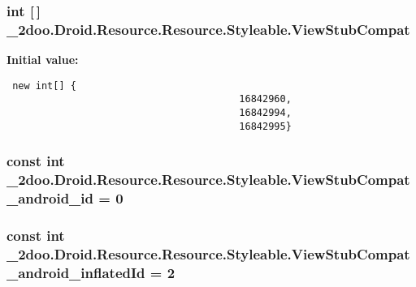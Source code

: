 \hypertarget{class__2doo_1_1_droid_1_1_resource_1_1_styleable_10c5bdeb8496455d9d7673eae67efe7a}{
\subsubsection[{ViewStubCompat}]{\setlength{\rightskip}{0pt plus 5cm}int \mbox{[}$\,$\mbox{]} \_\-2doo.Droid.Resource.Resource.Styleable.ViewStubCompat}}
\label{class__2doo_1_1_droid_1_1_resource_1_1_styleable_10c5bdeb8496455d9d7673eae67efe7a}


\textbf{Initial value:}

\begin{Code}\begin{verbatim} new int[] {
                                        16842960,
                                        16842994,
                                        16842995}
\end{verbatim}
\end{Code}
\hypertarget{class__2doo_1_1_droid_1_1_resource_1_1_styleable_65aff0a08cd100f823e9e9bd06397e64}{
\subsubsection[{ViewStubCompat\_\-android\_\-id}]{\setlength{\rightskip}{0pt plus 5cm}const int \_\-2doo.Droid.Resource.Resource.Styleable.ViewStubCompat\_\-android\_\-id = 0}}
\label{class__2doo_1_1_droid_1_1_resource_1_1_styleable_65aff0a08cd100f823e9e9bd06397e64}


\hypertarget{class__2doo_1_1_droid_1_1_resource_1_1_styleable_99e325b263c236e077fc8a03479b7682}{
\subsubsection[{ViewStubCompat\_\-android\_\-inflatedId}]{\setlength{\rightskip}{0pt plus 5cm}const int \_\-2doo.Droid.Resource.Resource.Styleable.ViewStubCompat\_\-android\_\-inflatedId = 2}}
\label{class__2doo_1_1_droid_1_1_resource_1_1_styleable_99e325b263c236e077fc8a03479b7682}


